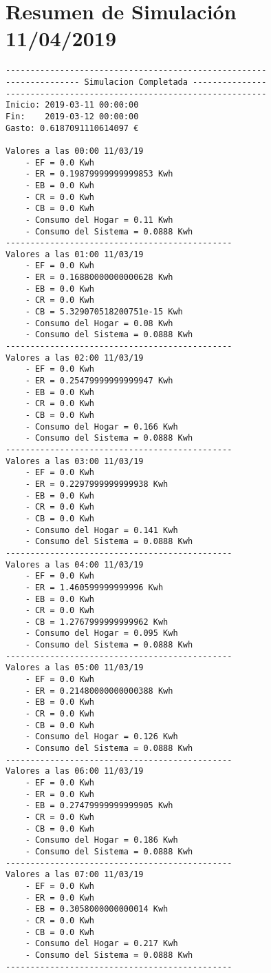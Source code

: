 \chapter{Resumen de Simulación 11/04/2019}
\label{cap:AnexoA}
\begin{lstlisting}[numbers=none,caption={Reporte de simulación 11/04},label={lst:simulationReport}]
-----------------------------------------------------
--------------- Simulacion Completada ---------------
-----------------------------------------------------
Inicio:	2019-03-11 00:00:00
Fin:	2019-03-12 00:00:00
Gasto: 0.6187091110614097 €

Valores a las 00:00 11/03/19
	- EF = 0.0 Kwh
	- ER = 0.19879999999999853 Kwh
	- EB = 0.0 Kwh
	- CR = 0.0 Kwh
	- CB = 0.0 Kwh
	- Consumo del Hogar = 0.11 Kwh
	- Consumo del Sistema = 0.0888 Kwh
----------------------------------------------
Valores a las 01:00 11/03/19
	- EF = 0.0 Kwh
	- ER = 0.16880000000000628 Kwh
	- EB = 0.0 Kwh
	- CR = 0.0 Kwh
	- CB = 5.329070518200751e-15 Kwh
	- Consumo del Hogar = 0.08 Kwh
	- Consumo del Sistema = 0.0888 Kwh
----------------------------------------------
Valores a las 02:00 11/03/19
	- EF = 0.0 Kwh
	- ER = 0.25479999999999947 Kwh
	- EB = 0.0 Kwh
	- CR = 0.0 Kwh
	- CB = 0.0 Kwh
	- Consumo del Hogar = 0.166 Kwh
	- Consumo del Sistema = 0.0888 Kwh
----------------------------------------------
Valores a las 03:00 11/03/19
	- EF = 0.0 Kwh
	- ER = 0.2297999999999938 Kwh
	- EB = 0.0 Kwh
	- CR = 0.0 Kwh
	- CB = 0.0 Kwh
	- Consumo del Hogar = 0.141 Kwh
	- Consumo del Sistema = 0.0888 Kwh
----------------------------------------------
Valores a las 04:00 11/03/19
	- EF = 0.0 Kwh
	- ER = 1.460599999999996 Kwh
	- EB = 0.0 Kwh
	- CR = 0.0 Kwh
	- CB = 1.2767999999999962 Kwh
	- Consumo del Hogar = 0.095 Kwh
	- Consumo del Sistema = 0.0888 Kwh
----------------------------------------------
Valores a las 05:00 11/03/19
	- EF = 0.0 Kwh
	- ER = 0.21480000000000388 Kwh
	- EB = 0.0 Kwh
	- CR = 0.0 Kwh
	- CB = 0.0 Kwh
	- Consumo del Hogar = 0.126 Kwh
	- Consumo del Sistema = 0.0888 Kwh
----------------------------------------------
Valores a las 06:00 11/03/19
	- EF = 0.0 Kwh
	- ER = 0.0 Kwh
	- EB = 0.27479999999999905 Kwh
	- CR = 0.0 Kwh
	- CB = 0.0 Kwh
	- Consumo del Hogar = 0.186 Kwh
	- Consumo del Sistema = 0.0888 Kwh
----------------------------------------------
Valores a las 07:00 11/03/19
	- EF = 0.0 Kwh
	- ER = 0.0 Kwh
	- EB = 0.3058000000000014 Kwh
	- CR = 0.0 Kwh
	- CB = 0.0 Kwh
	- Consumo del Hogar = 0.217 Kwh
	- Consumo del Sistema = 0.0888 Kwh
----------------------------------------------

\end{lstlisting}
